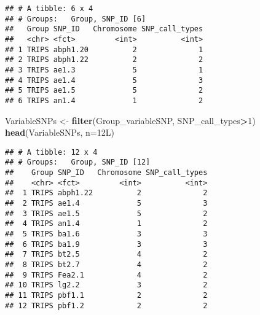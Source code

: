 \documentclass[]{article}
\newenvironment{Shaded}{\begin{snugshade}}{\end{snugshade}}
\newcommand{\KeywordTok}[1]{\textcolor[rgb]{0.13,0.29,0.53}{\textbf{#1}}}
\newcommand{\DataTypeTok}[1]{\textcolor[rgb]{0.13,0.29,0.53}{#1}}
\newcommand{\DecValTok}[1]{\textcolor[rgb]{0.00,0.00,0.81}{#1}}
\newcommand{\StringTok}[1]{\textcolor[rgb]{0.31,0.60,0.02}{#1}}
\newcommand{\OperatorTok}[1]{\textcolor[rgb]{0.81,0.36,0.00}{\textbf{#1}}}
\newcommand{\NormalTok}[1]{#1}
\begin{document}
\begin{verbatim}
## # A tibble: 6 x 4
## # Groups:   Group, SNP_ID [6]
##   Group SNP_ID   Chromosome SNP_call_types
##   <chr> <fct>         <int>          <int>
## 1 TRIPS abph1.20          2              1
## 2 TRIPS abph1.22          2              2
## 3 TRIPS ae1.3             5              1
## 4 TRIPS ae1.4             5              3
## 5 TRIPS ae1.5             5              2
## 6 TRIPS an1.4             1              2
\end{verbatim}

\begin{Shaded}
\begin{Highlighting}[]
\NormalTok{VariableSNPs <-}\StringTok{ }\KeywordTok{filter}\NormalTok{(Group_variableSNP, SNP_call_types}\OperatorTok{>}\DecValTok{1}\NormalTok{)}
\KeywordTok{head}\NormalTok{(VariableSNPs, }\DataTypeTok{n=}\NormalTok{12L)}
\end{Highlighting}
\end{Shaded}

\begin{verbatim}
## # A tibble: 12 x 4
## # Groups:   Group, SNP_ID [12]
##    Group SNP_ID   Chromosome SNP_call_types
##    <chr> <fct>         <int>          <int>
##  1 TRIPS abph1.22          2              2
##  2 TRIPS ae1.4             5              3
##  3 TRIPS ae1.5             5              2
##  4 TRIPS an1.4             1              2
##  5 TRIPS ba1.6             3              3
##  6 TRIPS ba1.9             3              3
##  7 TRIPS bt2.5             4              2
##  8 TRIPS bt2.7             4              2
##  9 TRIPS Fea2.1            4              2
## 10 TRIPS lg2.2             3              2
## 11 TRIPS pbf1.1            2              2
## 12 TRIPS pbf1.2            2              2
\end{verbatim}

\begin{Shaded}
\end{Shaded}
\end{document}
